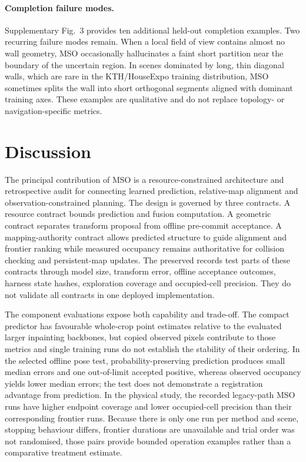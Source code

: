 \documentclass[11pt]{article}
\begin{document}
\paragraph{Completion failure modes.}
Supplementary Fig.~3 provides ten additional held-out completion examples. Two recurring failure modes remain. When a local field of view contains almost no wall geometry, MSO occasionally hallucinates a faint short partition near the boundary of the uncertain region. In scenes dominated by long, thin diagonal walls, which are rare in the KTH/HouseExpo training distribution, MSO sometimes splits the wall into short orthogonal segments aligned with dominant training axes. These examples are qualitative and do not replace topology- or navigation-specific metrics.


\section{Discussion} \label{sec:discussion}
The principal contribution of MSO is a resource-constrained architecture and retrospective audit for connecting learned prediction, relative-map alignment and observation-constrained planning. The design is governed by three contracts. A resource contract bounds prediction and fusion computation. A geometric contract separates transform proposal from offline pre-commit acceptance. A mapping-authority contract allows predicted structure to guide alignment and frontier ranking while measured occupancy remains authoritative for collision checking and persistent-map updates. The preserved records test parts of these contracts through model size, transform error, offline acceptance outcomes, harness state hashes, exploration coverage and occupied-cell precision. They do not validate all contracts in one deployed implementation.

The component evaluations expose both capability and trade-off. The compact predictor has favourable whole-crop point estimates relative to the evaluated larger inpainting backbones, but copied observed pixels contribute to those metrics and single training runs do not establish the stability of their ordering. In the selected offline pose test, probability-preserving prediction produces small median errors and one out-of-limit accepted positive, whereas observed occupancy yields lower median errors; the test does not demonstrate a registration advantage from prediction. In the physical study, the recorded legacy-path MSO runs have higher endpoint coverage and lower occupied-cell precision than their corresponding frontier runs. Because there is only one run per method and scene, stopping behaviour differs, frontier durations are unavailable and trial order was not randomised, those pairs provide bounded operation examples rather than a comparative treatment estimate.
\end{document}
